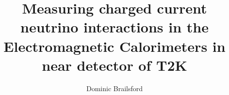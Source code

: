 \documentclass[hyperpdf,bindnopdf]{hepthesis}
\title{Measuring charged current neutrino interactions in the Electromagnetic Calorimeters in near detector of T2K}
\author{Dominic Brailsford}
\begin{document}
\begin{frontmatter}
  
\end{frontmatter}

\begin{mainmatter}

\setcounter{secnumdepth}{3}

  

\end{mainmatter}

%  

\begin{backmatter}
  
\end{backmatter}

\end{document}
